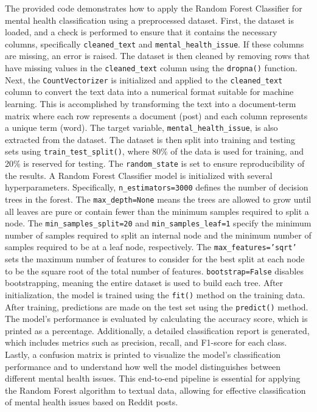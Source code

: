 \noindent
The provided code demonstrates how to apply the Random Forest Classifier for mental health classification using a preprocessed dataset. First, the dataset is loaded, and a check is performed to ensure that it contains the necessary columns, specifically \texttt{cleaned\_text} and \texttt{mental\_health\_issue}. If these columns are missing, an error is raised. The dataset is then cleaned by removing rows that have missing values in the \texttt{cleaned\_text} column using the \texttt{dropna()} function. Next, the \texttt{CountVectorizer} is initialized and applied to the \texttt{cleaned\_text} column to convert the text data into a numerical format suitable for machine learning. This is accomplished by transforming the text into a document-term matrix where each row represents a document (post) and each column represents a unique term (word). The target variable, \texttt{mental\_health\_issue}, is also extracted from the dataset. The dataset is then split into training and testing sets using \texttt{train\_test\_split()}, where 80\% of the data is used for training, and 20\% is reserved for testing. The \texttt{random\_state} is set to ensure reproducibility of the results. A Random Forest Classifier model is initialized with several hyperparameters. Specifically, \texttt{n\_estimators=3000} defines the number of decision trees in the forest. The \texttt{max\_depth=None} means the trees are allowed to grow until all leaves are pure or contain fewer than the minimum samples required to split a node. The \texttt{min\_samples\_split=20} and \texttt{min\_samples\_leaf=1} specify the minimum number of samples required to split an internal node and the minimum number of samples required to be at a leaf node, respectively. The \texttt{max\_features='sqrt'} sets the maximum number of features to consider for the best split at each node to be the square root of the total number of features. \texttt{bootstrap=False} disables bootstrapping, meaning the entire dataset is used to build each tree. After initialization, the model is trained using the \texttt{fit()} method on the training data. After training, predictions are made on the test set using the \texttt{predict()} method. The model's performance is evaluated by calculating the accuracy score, which is printed as a percentage. Additionally, a detailed classification report is generated, which includes metrics such as precision, recall, and F1-score for each class. Lastly, a confusion matrix is printed to visualize the model's classification performance and to understand how well the model distinguishes between different mental health issues. This end-to-end pipeline is essential for applying the Random Forest algorithm to textual data, allowing for effective classification of mental health issues based on Reddit posts.


